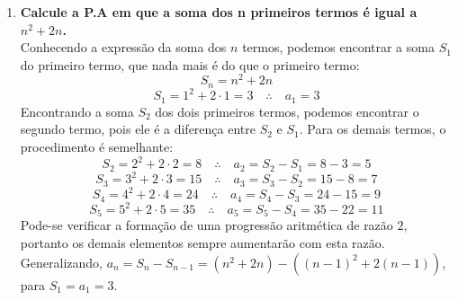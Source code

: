 \begin{enumerate}
	\item \textbf{Calcule a P.A em que a soma dos n primeiros termos é igual a $n^2 + 2n$.}\\
	Conhecendo a expressão da soma dos $n$ termos, podemos encontrar a soma $S_1$ do primeiro termo, que nada mais é do que o primeiro termo:
	$$ S_n = n^2 + 2n$$
	$$ S_1 = 1^2 + 2 \cdot 1 = 3 \quad \therefore \quad a_1 = 3 $$
	Encontrando a soma $S_2$ dos dois primeiros termos, podemos encontrar o segundo termo, pois ele é a diferença entre $S_2$ e $S_1$. Para os demais termos, o procedimento é semelhante:
	$$ S_2 = 2^2 + 2 \cdot 2 = 8 \quad \therefore \quad a_2 = S_2 - S_1 = 8 - 3 = 5 $$
	$$ S_3 = 3^2 + 2 \cdot 3 = 15 \quad \therefore \quad a_3 = S_3 - S_2 = 15 - 8 = 7 $$
	$$ S_4 = 4^2 + 2 \cdot 4 = 24 \quad \therefore \quad a_4 = S_4 - S_3 = 24 - 15 = 9 $$
	$$ S_5 = 5^2 + 2 \cdot 5 = 35 \quad \therefore \quad a_5 = S_5 - S_4 = 35 - 22 = 11 $$
	Pode-se verificar a formação de uma progressão aritmética de razão $2$, portanto os demais elementos sempre aumentarão com esta razão.\\
	Generalizando, $a_n = S_n - S_{n-1} = (n^2 + 2n) - ((n-1)^2 + 2(n-1))$, para $S_1 = a_1 = 3$.
	

\end{enumerate}
